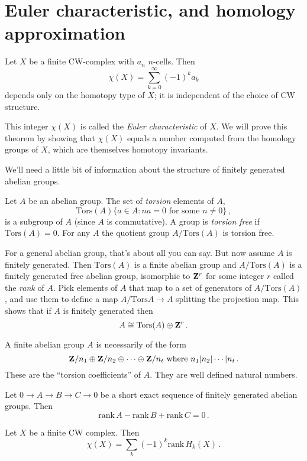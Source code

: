 \section{Euler characteristic, and homology approximation}


\begin{theorem} Let $X$ be a finite CW-complex with $a_n$ $n$-cells. Then 
\[
\chi(X)=\sum^\infty_{k=0}(-1)^k a_k
\]
depends only on the homotopy type of $X$; it is independent of the choice of
CW structure. 
\end{theorem}
This integer $\chi(X)$ is called the {\em Euler characteristic} of $X$. We will prove this theorem by showing that $\chi(X)$ equals a number computed from the homology groups of $X$, which are themselves homotopy invariants. 

We'll need a little bit of information about the structure of finitely generated abelian groups.

Let $A$ be an abelian group. The set of {\em torsion} elements of $A$,
\[
\mathrm{Tors}(A)\{a\in A:na=0\,\,\text{for some}\,\,n\neq0\}\,,
\]
is a subgroup of $A$ (since $A$ is commutative). A group is \emph{torsion free}
if $\mathrm{Tors}(A)=0$. For any $A$ the quotient group 
$A/\mathrm{Tors}(A)$ is torsion free. 

For a general abelian group, that's about all you can say. But now assume $A$ is finitely generated. Then $\mathrm{Tors}(A)$ is a finite abelian group and
$A/\mathrm{Tors}(A)$ is a finitely generated free abelian group, isomorphic to $\mathbf Z^r$ for some integer $r$ called the \emph{rank} of $A$. Pick elements of
$A$ that map to a set of generators of $A/\mathrm{Tors}(A)$, and use them
to define a map $A/\mathrm{Tors}A\to A$ splitting the projection map. This shows that if $A$ is finitely generated then
\[
A\cong\mathrm{Tors}(A)\oplus\mathbf Z^r\,.
\]

A finite abelian group $A$ is necessarily of the form 
\[
\mathbf Z/n_1\oplus\mathbf Z/n_2\oplus\cdots\oplus\mathbf Z/n_t\,\,\hbox{where}\,\,
n_1|n_2|\cdots|n_t\,.
\]
These are the ``torsion coefficients'' of $A$. They are well defined natural
numbers.

\begin{lemma} Let $0\to A\to B\to C\to 0$ be a short exact sequence of finitely
generated abelian groups. Then
\[
\mathrm{rank}\,A-\mathrm{rank}\,B+\mathrm{rank}\,C=0\,.
\]
\end{lemma}

\begin{theorem} Let $X$ be a finite CW complex. Then
\[
\chi(X)=\sum_k(-1)^k\mathrm{rank}\,H_k(X)\,.
\]
\end{theorem}

